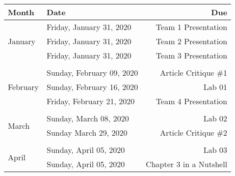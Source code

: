 \documentclass[
]{article}
\begin{document}
\begin{tabularx}{\linewidth}{p{4cm}Xr}
\hline
\textbf{Month} & \textbf{Date} & \textbf{Due} \\
\hline
\multirow{3}{*}{January} & Friday, January 31, 2020 & Team 1 Presentation \\
& Friday, January 31, 2020 & Team 2 Presentation \\
& Friday, January 31, 2020 & Team 3 Presentation \\
\hline
&  &  \\

\multirow{3}{*}{February} & Sunday, February 09, 2020 & Article Critique \#1 \\
& Sunday, February 16, 2020 & Lab 01 \\
& Friday, February 21, 2020 & Team 4 Presentation \\
\hline
&  &  \\

\multirow{2}{*}{March} & Sunday, March 08, 2020 & Lab 02 \\
& Sunday March 29, 2020 & Article Critique \#2 \\
\hline
&  &  \\

\multirow{2}{*}{April} & Sunday, April 05, 2020 & Lab 03 \\
& Sunday, April 05, 2020 & Chapter 3 in a Nutshell \\
\hline
\end{tabularx}
\end{document}
